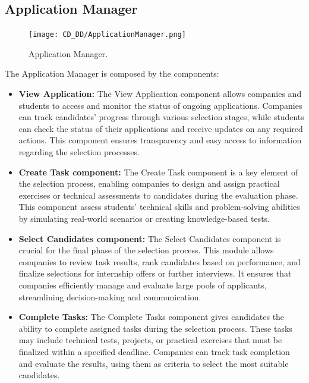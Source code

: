 \subsection{Application Manager}
\label{subsec:application_manager}%

\begin{figure}[H]
    \begin{center}
        \texttt{[image: CD\_DD/ApplicationManager.png]}
        \caption{Application Manager.}
        \label{fig:application_manager}%
    \end{center}
\end{figure}

\noindent The Application Manager is composed by the components:

\begin{itemize}
    \item \textbf{View Application:} The View Application component allows companies and students to access and monitor the status of ongoing applications. Companies can track candidates' progress through various selection stages, while students can check the status of their applications and receive updates on any required actions. This component ensures transparency and easy access to information regarding the selection processes.
    \item \textbf{Create Task component:} The Create Task component is a key element of the selection process, enabling companies to design and assign practical exercises or technical assessments to candidates during the evaluation phase. This component assess students' technical skills and problem-solving abilities by simulating real-world scenarios or creating knowledge-based tests.
    \item \textbf{Select Candidates component:} The Select Candidates component is crucial for the final phase of the selection process. This module allows companies to review task results, rank candidates based on performance, and finalize selections for internship offers or further interviews. It ensures that companies efficiently manage and evaluate large pools of applicants, streamlining decision-making and communication.
    \item \textbf{Complete Tasks:} The Complete Tasks component gives candidates the ability to complete assigned tasks during the selection process. These tasks may include technical tests, projects, or practical exercises that must be finalized within a specified deadline. Companies can track task completion and evaluate the results, using them as criteria to select the most suitable candidates.
\end{itemize}

